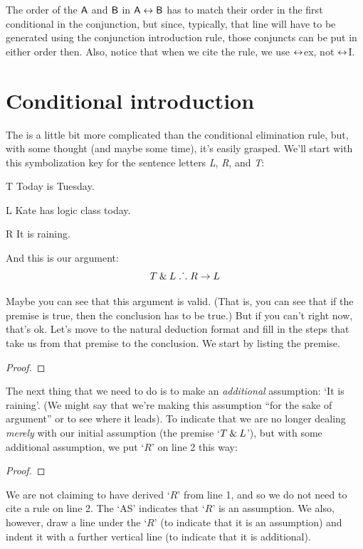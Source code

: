 
The order of the $\mathsf{A}$ and $\mathsf{B}$ in $\mathsf{A}\leftrightarrow\mathsf{B}$ has to match their order in the first conditional in the conjunction, but since, typically, that line will have to be generated using the conjunction introduction rule, those conjuncts  can be put in either order then. Also, notice that when we cite the rule, we use $\leftrightarrow$ex, not $\leftrightarrow$I.


\section{Conditional introduction}

The  is a little bit more complicated than the conditional elimination rule, but, with some thought (and maybe some time), it's easily grasped. We'll start with this symbolization key for the sentence letters \textit{L}, \textit{R}, and \textit{T}:
	\begin{ekey}
		\item[T] Today is Tuesday.
		\item[L] Kate has logic class today.
		\item[R] It is raining.
	\end{ekey}
And this is our argument: 
$$T \mathbin{\&} L \mathrel{\ldotp\dot{}\,\ldotp} R \rightarrow L$$
 
Maybe you can see that this argument is valid. (That is, you can see that if the premise is true, then the conclusion has to be true.) But if you can't right now, that's ok. Let's move to the natural deduction format and fill in the steps that take us from that premise to the conclusion. We start by listing the premise.
	\begin{proof}
		 
	\end{proof}
The next thing that we need to do is to make an \emph{additional} assumption: `It is raining'. (We might say that we're making this assumption ``for the sake of argument'' or to see where it leads). To indicate that we are no longer dealing \emph{merely} with our initial assumption (the premise `$T \mathbin{\&} L$'), but with some additional assumption, we put `$R$' on line 2 this way:
	\begin{proof}
		 
		\open
			 
	\end{proof}
We are not claiming to have derived `$R$' from line 1, and so we do not need to cite a rule on line 2. The `AS' indicates that `$R$' is an assumption. We also, however, draw a line under the `$R$' (to indicate that it is an assumption) and indent it with a further vertical line (to indicate that it is additional). 

